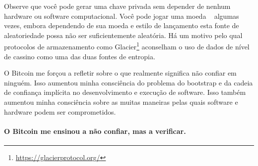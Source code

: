 Observe que você pode gerar uma chave privada sem depender de nenhum hardware ou software computacional. Você pode jogar uma moeda ~\cite{antonopoulos2014mastering} algumas vezes, embora dependendo de sua moeda e estilo de lançamento esta fonte de aleatoriedade possa não ser suficientemente aleatória. Há um motivo pelo qual protocolos de armazenamento como Glacier\footnote{\url{https://glacierprotocol.org/}} aconselham o uso de dados de nível de cassino como uma das duas fontes de entropia.

O Bitcoin me forçou a refletir sobre o que realmente significa não confiar em ninguém. Isso aumentou minha consciência do problema do bootstrap e da cadeia de confiança implícita no desenvolvimento e execução de software. Isso também aumentou minha consciência sobre as muitas maneiras pelas quais software e hardware podem ser comprometidos.

\paragraph{O Bitcoin me ensinou a não confiar, mas a verificar.}

%
%
%
%
